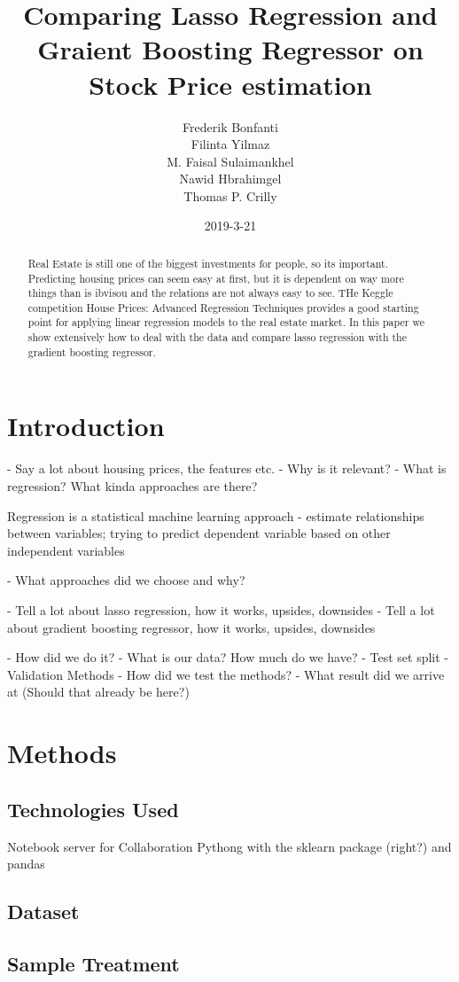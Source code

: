 \documentclass{article}
\title{Comparing Lasso Regression and Graient Boosting Regressor on Stock Price estimation}
\date{2019-3-21}
\author{Frederik Bonfanti \\ Filinta Yilmaz \\ M. Faisal Sulaimankhel \\ Nawid Hbrahimgel \\ Thomas P. Crilly}
\begin{document}
\maketitle

\begin{abstract}
Real Estate is still one of the biggest investments for people, so its important.
Predicting housing prices can seem easy at first, but it is dependent on way more things than is ibvisou and the relations are not always easy to see.
THe Keggle competition House Prices: Advanced Regression Techniques provides a good starting point for applying linear regression models to the real estate market.
In this paper we show extensively how to deal with the data and compare lasso regression with the gradient boosting regressor.
\end{abstract}

\section{Introduction}
 - Say a lot about housing prices, the features etc.
 - Why is it relevant?
 - What is regression? What kinda approaches are there?

Regression is a statistical machine learning approach 
- estimate relationships between variables; trying to predict dependent variable based on other independent variables

 - What approaches did we choose and why?

   - Tell a lot about lasso regression, how it works, upsides, downsides
   - Tell a lot about gradient boosting regressor, how it works, upsides, downsides

 - How did we do it?
 - What is our data? How much do we have?
 - Test set split
 - Validation Methods
 - How did we test the methods?
 - What result did we arrive at (Should that already be here?)
\section{Methods}
\subsection{Technologies Used}
Notebook server for Collaboration
Pythong with the sklearn package (right?) and pandas
\subsection{Dataset} 
\subsection{Sample Treatment}
\end{document}
